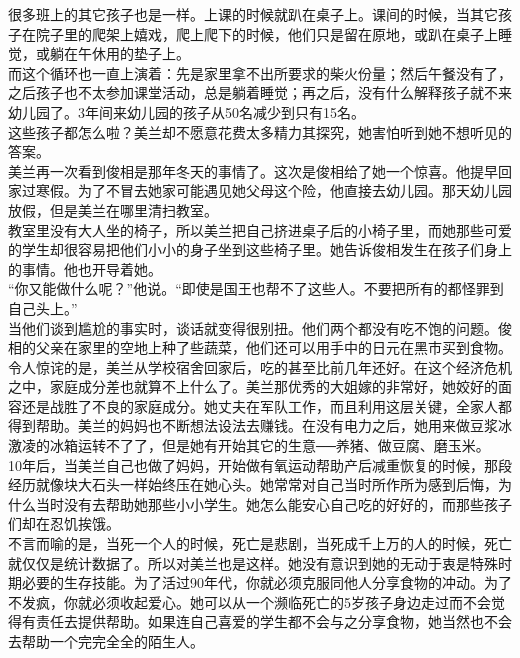 \begin{multicols}{\theparacolNo}
很多班上的其它孩子也是一样。上课的时候就趴在桌子上。课间的时候，当其它孩子在院子里的爬架上嬉戏，爬上爬下的时候，他们只是留在原地，或趴在桌子上睡觉，或躺在午休用的垫子上。\\

而这个循环也一直上演着：先是家里拿不出所要求的柴火份量；然后午餐没有了，之后孩子也不太参加课堂活动，总是躺着睡觉；再之后，没有什么解释孩子就不来幼儿园了。3年间来幼儿园的孩子从50名减少到只有15名。\\

这些孩子都怎么啦？美兰却不愿意花费太多精力其探究，她害怕听到她不想听见的答案。\\

美兰再一次看到俊相是那年冬天的事情了。这次是俊相给了她一个惊喜。他提早回家过寒假。为了不冒去她家可能遇见她父母这个险，他直接去幼儿园。那天幼儿园放假，但是美兰在哪里清扫教室。\\

教室里没有大人坐的椅子，所以美兰把自己挤进桌子后的小椅子里，而她那些可爱的学生却很容易把他们小小的身子坐到这些椅子里。她告诉俊相发生在孩子们身上的事情。他也开导着她。\\

“你又能做什么呢？”他说。“即使是国王也帮不了这些人。不要把所有的都怪罪到自己头上。”\\

当他们谈到尴尬的事实时，谈话就变得很别扭。他们两个都没有吃不饱的问题。俊相的父亲在家里的空地上种了些蔬菜，他们还可以用手中的日元在黑市买到食物。令人惊诧的是，美兰从学校宿舍回家后，吃的甚至比前几年还好。在这个经济危机之中，家庭成分差也就算不上什么了。美兰那优秀的大姐嫁的非常好，她姣好的面容还是战胜了不良的家庭成分。她丈夫在军队工作，而且利用这层关键，全家人都得到帮助。美兰的妈妈也不断想法设法去赚钱。在没有电力之后，她用来做豆浆冰激凌的冰箱运转不了了，但是她有开始其它的生意──养猪、做豆腐、磨玉米。\\

10年后，当美兰自己也做了妈妈，开始做有氧运动帮助产后减重恢复的时候，那段经历就像块大石头一样始终压在她心头。她常常对自己当时所作所为感到后悔，为什么当时没有去帮助她那些小小学生。她怎么能安心自己吃的好好的，而那些孩子们却在忍饥挨饿。\\

不言而喻的是，当死一个人的时候，死亡是悲剧，当死成千上万的人的时候，死亡就仅仅是统计数据了。所以对美兰也是这样。她没有意识到她的无动于衷是特殊时期必要的生存技能。为了活过90年代，你就必须克服同他人分享食物的冲动。为了不发疯，你就必须收起爱心。她可以从一个濒临死亡的5岁孩子身边走过而不会觉得有责任去提供帮助。如果连自己喜爱的学生都不会与之分享食物，她当然也不会去帮助一个完完全全的陌生人。\\
\ifnum{}
	\end{multicols}
\fi